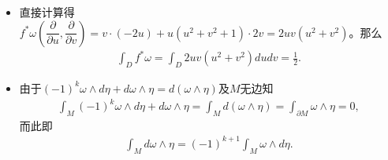 \begin{itemize}
\item[22.] 
    直接计算得$f^{*}\omega(\dfrac{\partial}{\partial u},\dfrac{\partial}{\partial v})
    = v\cdot (-2u) + u(u^{2}+v^{2}+1)\cdot 2v = 2uv(u^{2}+v^{2})$。那么
    \begin{equation*}
        \begin{aligned}
            \int_{D}f^{*}\omega = \int_{D}2uv(u^{2}+v^{2})dudv=\frac{1}{2}.
        \end{aligned}
    \end{equation*}

\item[23.] 
    由于$(-1)^{k}\omega\wedge d\eta + d\omega\wedge \eta = d(\omega\wedge\eta)$及$M$无边知
    \begin{equation*}
        \begin{aligned}
            \int_{M}(-1)^{k}\omega\wedge d\eta + d\omega\wedge \eta=\int_{M}d(\omega\wedge\eta)=\int_{\partial M}\omega\wedge\eta=0,
        \end{aligned}
    \end{equation*}
    而此即
    \begin{equation*}\begin{aligned}
        \int_{M}d\omega\wedge\eta = (-1)^{k+1}\int_{M}\omega\wedge d\eta.
    \end{aligned}\end{equation*}


\end{itemize}
